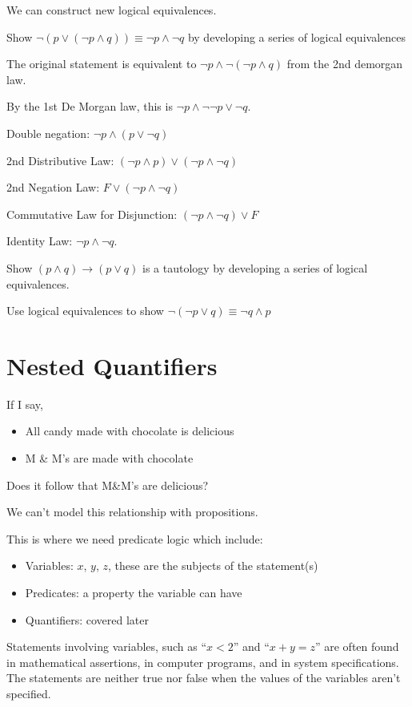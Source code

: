 \documentclass[../discrete.tex]{subfiles}
\begin{document}
We can construct new logical equivalences.
\begin{example}
    Show $\neg(p\lor (\neg p\land q))\equiv \neg p\land \neg q$ by developing a series of logical equivalences 
    
    The original statement is equivalent to $\neg p\land \neg(\neg p\land q)$ from the 2nd demorgan law.
    
    By the 1st De Morgan law, this is $\neg p\land \neg\neg p\lor \neg q$.

    Double negation: $\neg p\land (p\lor \neg q)$

    2nd Distributive Law: $(\neg p\land p)\lor (\neg p\land \neg q)$

    2nd Negation Law: $F\lor (\neg p\land \neg q)$

    Commutative Law for Disjunction: $(\neg p\land \neg q)\lor F$

    Identity Law: $\neg p\land \neg q$.
\end{example}

\ex Show $(p\land q)\rightarrow (p\lor q)$ is a tautology by developing a series of logical equivalences.

\ex Use logical equivalences to show $\neg(\neg p\lor q)\equiv \neg q\land p$


\section{Nested Quantifiers}
If I say,
\begin{itemize}
    \item All candy made with chocolate is delicious 
    \item M \& M's are made with chocolate 
\end{itemize}
Does it follow that M\&M's are delicious?

We can't model this relationship with propositions.

This is where we need predicate logic which include:
\begin{itemize}
    \item Variables: $x$, $y$, $z$, these are the subjects of the statement(s)
    \item Predicates: a property the variable can have 
    \item Quantifiers: covered later 
\end{itemize}

Statements involving variables, such as ``$x<2$'' and ``$x+y=z$'' are often found in mathematical assertions, in computer programs, and in system specifications. The statements are neither true nor false when the values of the variables aren't specified.
\end{document}
